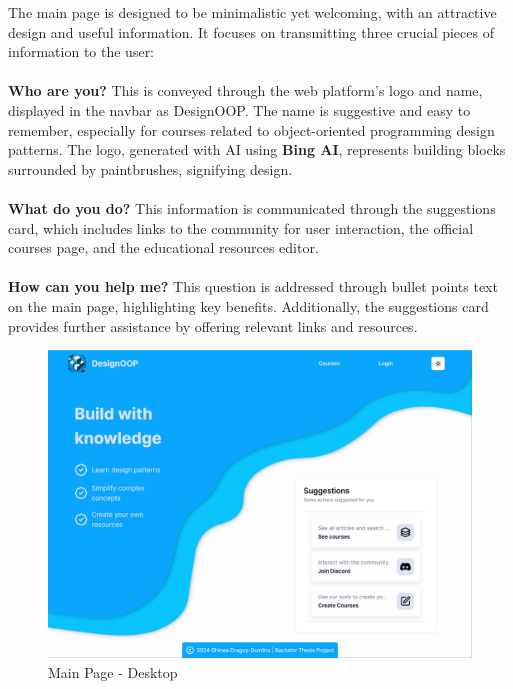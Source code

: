 The main page is designed to be minimalistic yet welcoming, with an attractive design and useful information. It focuses on transmitting three crucial pieces of information to the user:
\\\\
\noindent \textbf{Who are you?} This is conveyed through the web platform's logo and name, displayed in the navbar as DesignOOP. The name is suggestive and easy to remember, especially for courses related to object-oriented programming design patterns. The logo, generated with AI using \textbf{Bing AI}, represents building blocks surrounded by paintbrushes, signifying design.
\\\\
\noindent \textbf{What do you do?} This information is communicated through the suggestions card, which includes links to the community for user interaction, the official courses page, and the educational resources editor.
\\\\
\noindent \textbf{How can you help me?} This question is addressed through bullet points text on the main page, highlighting key benefits. Additionally, the suggestions card provides further assistance by offering relevant links and resources.

\begin{figure}[h]
    \centering
    \includegraphics[scale=0.45, trim = {0 0 1 0}, clip]{images/main-page-desktop.png}
    \caption{Main Page - Desktop}
    \label{fig:main-page-desktop}
\end{figure}

